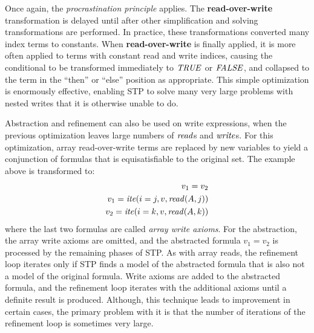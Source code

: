 
Once again, the {\it procrastination principle} applies.  The
{\bf read-over-write} transformation is delayed until after other
simplification and solving transformations are performed.  In
practice, these transformations converted many index terms to
constants.  When {\bf read-over-write} is finally applied, it is
more often applied to terms with constant read and write indices,
causing the conditional to be transformed immediately to 
${\it TRUE}$ or ${\it FALSE}$, and collapsed to the term in the ``then''
or ``else'' position as appropriate.
This simple optimization is enormously effective, enabling STP to
solve many very large problems with nested writes that it is otherwise
unable to do.

Abstraction and refinement can also be used on write expressions, when
the previous optimization leaves large numbers of ${\it read}$s and
${\it write}$s. For this optimization, array read-over-write terms are
replaced by new variables to yield a conjunction of formulas that is
equisatisfiable to the original set.  The example above is transformed
to:
\begin{eqnarray}
v_1 = v_2 \nonumber\\
v_1 = {\it ite}(i=j,v,{\it read}(A,j)) \nonumber\\
v_2 = {\it ite}(i=k,v,{\it read}(A,k)) \nonumber
\end{eqnarray}
where the last two formulas are called {\it array write axioms}. For
the abstraction, the array write axioms are omitted, and the
abstracted formula $v_1 = v_2$ is processed by the remaining phases of
STP.  As with array reads, the refinement loop iterates only if STP
finds a model of the abstracted formula that is also not a model of
the original formula. Write axioms are added to the abstracted
formula, and the refinement loop iterates with the additional axioms
until a definite result is produced. Although, this technique leads to
improvement in certain cases, the primary problem with it is that the
number of iterations of the refinement loop is sometimes very large.

